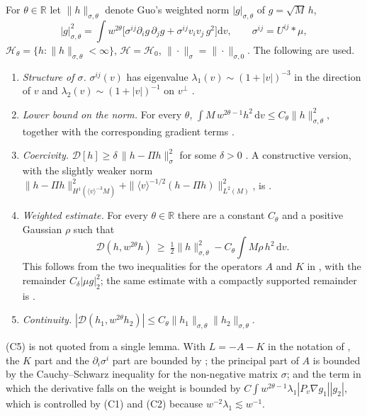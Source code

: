 \documentclass[11pt]{article}
\newcommand{\dd}{\mathrm{d}}
\newcommand{\cD}{\mathcal{D}}
\newcommand{\cH}{\mathcal{H}}
\newcommand{\jap}[1]{\langle #1\rangle}
\theoremstyle{remark}
\begin{document}
For $\theta\in\mathbb{R}$ let $\|h\|_{\sigma,\theta}$ denote Guo's weighted
norm $|g|_{\sigma,\theta}$ of $g=\sqrt M\,h$,
\[
  |g|^2_{\sigma,\theta}=\int w^{2\theta}\bigl[\sigma^{ij}\partial_ig\,\partial_jg
  +\sigma^{ij}v_iv_j\,g^2\bigr]\dd v,\qquad \sigma^{ij}=U^{ij}*\mu,
\]
$\cH_\theta=\{h:\|h\|_{\sigma,\theta}<\infty\}$, $\cH=\cH_0$,
$\|\cdot\|_\sigma=\|\cdot\|_{\sigma,0}$. The following are used.

\begin{enumerate}
  \item[(C1)] \emph{Structure of $\sigma$.} $\sigma^{ij}(v)$ has eigenvalue
    $\lambda_1(v)\sim(1+|v|)^{-3}$ in the direction of $v$ and
    $\lambda_2(v)\sim(1+|v|)^{-1}$ on $v^\perp$
    \cite[Lemma~2.3]{KGH}.
  \item[(C2)] \emph{Lower bound on the norm.} For every $\theta$,
    $\int M\,w^{2\theta-1}h^2\,\dd v\le C_\theta\|h\|^2_{\sigma,\theta}$,
    together with the corresponding gradient terms
    \cite[Lemma~2.5]{KGH}.
  \item[(C3)] \emph{Coercivity.} $\cD[h]\ge\delta\,\|h-\Pi h\|^2_\sigma$ for
    some $\delta>0$ \cite[Lemma~2.6]{KGH}. A constructive version, with the
    slightly weaker norm
    $\|h-\Pi h\|^2_{H^1(\jap v^{-3}M)}+\|\jap v^{-1/2}(h-\Pi h)\|^2_{L^2(M)}$,
    is \cite[Theorem~1.3]{Mouhot}.
  \item[(C4)] \emph{Weighted estimate.} For every $\theta\in\mathbb{R}$ there
    are a constant $C_\theta$ and a positive Gaussian $\rho$ such that
    \[
      \cD(h,w^{2\theta}h)\ \ge\ \tfrac12\|h\|^2_{\sigma,\theta}
      -C_\theta\int M\rho\,h^2\,\dd v .
    \]
    This follows from the two inequalities for the operators $A$ and $K$ in
    \cite[Lemma~2.7]{KGH}, with the remainder $C_\delta|\mu g|_2^2$; the
    same estimate with a compactly supported remainder is
    \cite[Lemma~9]{StrainGuo}.
  \item[(C5)] \emph{Continuity.}
    $|\cD(h_1,w^{2\theta}h_2)|\le C_\theta\|h_1\|_{\sigma,\theta}\|h_2\|_{\sigma,\theta}$.
\end{enumerate}
(C5) is not quoted from a single lemma. With $L=-A-K$ in the notation of
\cite{KGH}, the $K$ part and the $\partial_i\sigma^i$ part are bounded by
\cite[Lemmas~2.6, 2.7]{KGH}; the principal part of $A$ is bounded by the
Cauchy--Schwarz inequality for the non-negative matrix $\sigma$; and the
term in which the derivative falls on the weight is bounded by
$C\int w^{2\theta-1}\lambda_1|P_v\nabla g_1||g_2|$, which is controlled by
(C1) and (C2) because $w^{-2}\lambda_1\lesssim w^{-1}$.
\end{document}
